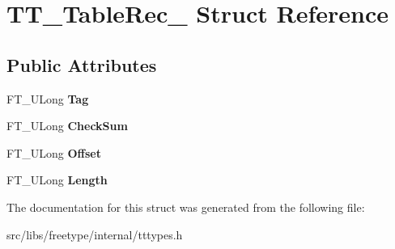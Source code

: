 \hypertarget{struct_t_t___table_rec__}{
\section{TT\_\-TableRec\_\- Struct Reference}
\label{struct_t_t___table_rec__}
}
\subsection*{Public Attributes}
\begin{DoxyCompactItemize}
\item 
\hypertarget{struct_t_t___table_rec___aaccaf9e9d3421fc37fa6e51875534995}{
FT\_\-ULong {\bfseries Tag}}
\label{struct_t_t___table_rec___aaccaf9e9d3421fc37fa6e51875534995}

\item 
\hypertarget{struct_t_t___table_rec___aacf9207fae3522bb65359c2288900fca}{
FT\_\-ULong {\bfseries CheckSum}}
\label{struct_t_t___table_rec___aacf9207fae3522bb65359c2288900fca}

\item 
\hypertarget{struct_t_t___table_rec___a91840e1cee040f8da6a34a081dda17b6}{
FT\_\-ULong {\bfseries Offset}}
\label{struct_t_t___table_rec___a91840e1cee040f8da6a34a081dda17b6}

\item 
\hypertarget{struct_t_t___table_rec___aa0d3a1f4491bf4418bc26241bdd7d21b}{
FT\_\-ULong {\bfseries Length}}
\label{struct_t_t___table_rec___aa0d3a1f4491bf4418bc26241bdd7d21b}

\end{DoxyCompactItemize}


The documentation for this struct was generated from the following file:\begin{DoxyCompactItemize}
\item 
src/libs/freetype/internal/tttypes.h\end{DoxyCompactItemize}
